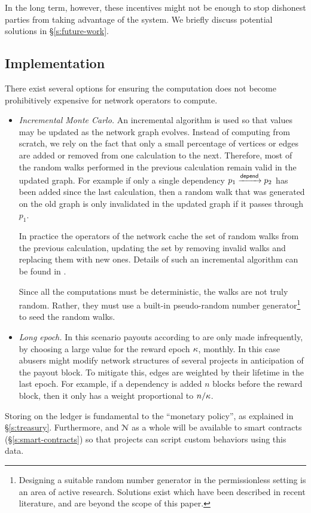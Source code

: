 In the long term, however, these incentives might not be enough to stop dishonest
parties from taking advantage of the system. We briefly discuss potential
solutions in \S\ref{s:future-work}.

\subsection{Implementation}

There exist several options for ensuring the \osrank{} computation
does not become prohibitively expensive for network operators to compute.

\begin{itemize}
\item \emph{Incremental Monte Carlo.} An incremental algorithm is used so that
  \osrank{} values may be updated as the network graph evolves. Instead of
  computing \osrank{} from scratch, we rely on the fact that only a small
  percentage of vertices or edges are added or removed
  from one calculation to the next. Therefore, most of the random walks
  performed in the previous calculation remain valid in the updated graph. For
  example if only a single dependency $p_1 \xrightarrow[]{\mathsf{depend}} p_2$ has been
  added since the last calculation, then a random walk that was generated on the
  old graph is only invalidated in the updated graph if it passes through $p_1$.

  In practice the operators of the network cache the set of random
  walks from the previous calculation, updating the set by removing
  invalid walks and replacing them with new ones. Details of such an
  incremental \pagerank{} algorithm can be found
  in \cite{incr pagerank}.

  Since all the computations must be deterministic, the walks are not truly
  random. Rather, they must use a built-in pseudo-random number
  generator\footnote{Designing a suitable random number generator in the
  permissionless setting is an area of active research. Solutions exist
  which have been described in recent literature, and are beyond the
  scope of this paper.} to seed the random walks.

\item \emph{Long epoch.} In this scenario payouts according to
  \osrank{} are only made infrequently, by choosing a large value for the
  reward epoch $\kappa$, \eg{} monthly.  In this case
  abusers might modify network structures of several projects in
  anticipation of the payout block. To mitigate this, edges are
  weighted by their lifetime in the last epoch. For
  example, if a dependency is added $n$ blocks before the reward block,
  then it only has a weight proportional to $n/\kappa$.
\end{itemize}

\bigskip

\noindent Storing \osrank{} on the ledger is fundamental to the \oscoin{}
``monetary policy'', as explained in \S \ref{s:treasury}. Furthermore,
\osrank{} and $\mathcal{N}$ as a whole will be available to smart contracts
(\S\ref{s:smart-contracts}) so that projects can script custom behaviors using
this data.
